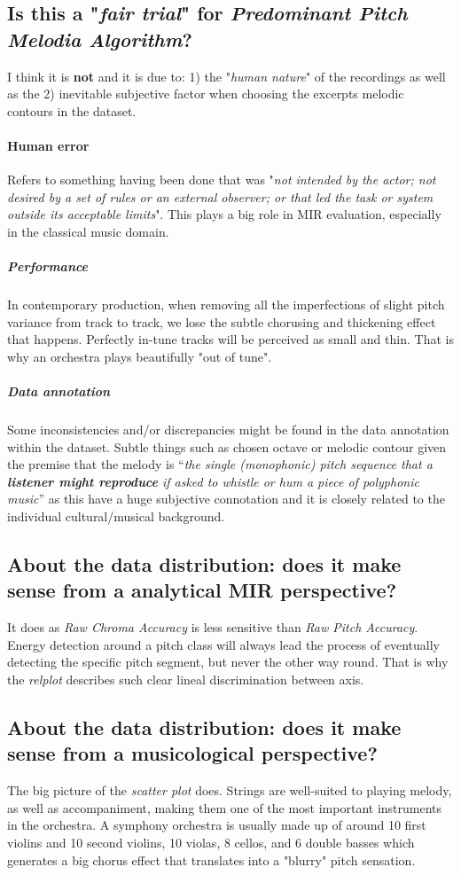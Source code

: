 \documentclass{article}
\begin{document}
\subsection{Is this a "\textit{fair trial}" for \textit{Predominant Pitch Melodia Algorithm}?}
I think it is \textbf{not} and it is due to: 1) the "\textit{human nature}" of the recordings as well as the 2) inevitable subjective factor when choosing the excerpts melodic contours in the dataset.
\paragraph{Human error}Refers to something having been done that was "\textit{not intended by the actor; not desired by a set of rules or an external observer; or that led the task or system outside its acceptable limits}". This plays a big role in MIR evaluation, especially in the classical music domain.
\subparagraph{Performance}In contemporary production, when removing all the imperfections of slight pitch variance from track to track, we lose the subtle chorusing and thickening effect that happens. Perfectly in-tune tracks will be perceived as small and thin. That is why an orchestra plays beautifully "out of tune".
\subparagraph{Data annotation}Some inconsistencies and/or discrepancies might be found in the data annotation within the dataset. Subtle things such as chosen octave or melodic contour given the premise that the melody is “\textit{the single (monophonic) pitch sequence that a \textbf{listener might reproduce} if asked to whistle or hum a piece of polyphonic music}” as this have a huge subjective connotation and it is closely related to the individual cultural/musical background.

\subsection{About the data distribution: does it make sense from a analytical MIR perspective?}
It does as \textit{Raw Chroma Accuracy} is less sensitive than \textit{Raw Pitch Accuracy}. Energy detection around a pitch class will always lead the process of eventually detecting the specific pitch segment, but never the other way round. That is why the \textit{relplot} describes such clear lineal discrimination between axis.

\subsection{About the data distribution: does it make sense from a musicological perspective?}
The big picture of the \textit{scatter plot} does. Strings are well-suited to playing melody, as well as accompaniment, making them one of the most important instruments in the orchestra. A symphony orchestra is usually made up of around 10 first violins and 10 second violins, 10 violas, 8 cellos, and 6 double basses which generates a big chorus effect that translates into a "blurry" pitch sensation.
\end{document}
